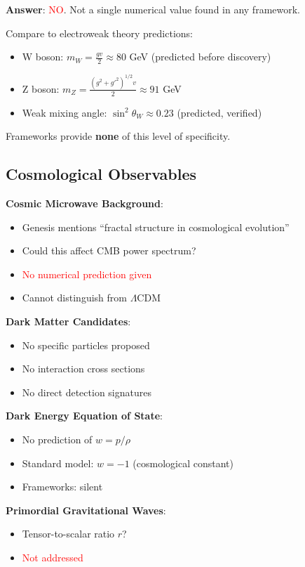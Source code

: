 \textbf{Answer}: \textcolor{red}{NO}. Not a single numerical value found in any framework.

\begin{example}
Compare to electroweak theory predictions:
\begin{itemize}
    \item W boson: $m_W = \frac{g v}{2} \approx 80$ GeV (predicted before discovery)
    \item Z boson: $m_Z = \frac{(g^2 + g'^2)^{1/2} v}{2} \approx 91$ GeV
    \item Weak mixing angle: $\sin^2\theta_W \approx 0.23$ (predicted, verified)
\end{itemize}

Frameworks provide \textbf{none} of this level of specificity.
\end{example}

\subsection{Cosmological Observables}

\textbf{Cosmic Microwave Background}:
\begin{itemize}
    \item Genesis mentions ``fractal structure in cosmological evolution''
    \item Could this affect CMB power spectrum?
    \item \textcolor{red}{No numerical prediction given}
    \item Cannot distinguish from $\Lambda$CDM
\end{itemize}

\textbf{Dark Matter Candidates}:
\begin{itemize}
    \item No specific particles proposed
    \item No interaction cross sections
    \item No direct detection signatures
\end{itemize}

\textbf{Dark Energy Equation of State}:
\begin{itemize}
    \item No prediction of $w = p/\rho$
    \item Standard model: $w = -1$ (cosmological constant)
    \item Frameworks: silent
\end{itemize}

\textbf{Primordial Gravitational Waves}:
\begin{itemize}
    \item Tensor-to-scalar ratio $r$?
    \item \textcolor{red}{Not addressed}
\end{itemize}

